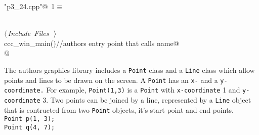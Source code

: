 \documentclass{article}
\begin{document}
\begin{flushleft} \small
\begin{minipage}{\linewidth}\label{scrap1}\raggedright\small
{} \verb@"p3_24.cpp"@\nobreak\ {\footnotesize {1}}$\equiv$
\vspace{-1ex}
\begin{list}{}{} \item
\mbox{}\verb@@\\
\mbox{}\verb@@\hbox{$\langle\,${\it Include Files}\nobreak\ {\footnotesize {}}$\,\rangle$}\verb@@\\
\mbox{}\verb@int ccc_win_main()//authors entry point that calls name@\\
\mbox{}@\\
\mbox{}\verb@@{\NWsep}
\end{list}
\vspace{-1.5ex}
\footnotesize
\begin{list}{}{\setlength{\itemsep}{-\parsep}\setlength{\itemindent}{-\leftmargin}}

\item{}
\end{list}
\end{minipage}\vspace{4ex}
\end{flushleft}
The authors graphics library includes a \verb|Point| class and
a \verb|Line| class which allow points and lines to be drawn on
the screen. A \verb|Point| has an \verb|x-| and a \verb|y-coordinate.|
For example, \verb|Point(1,3)| is a \verb|Point| with \verb|x-coordinate|
1 and \verb|y-coordinate| 3. Two points can be joined by a line, represented
by a \verb|Line| object that is contructed from two \verb|Point| objects,
it's start point and end points.\\
\indent \verb|Point p(1, 3);|\\
\indent \verb|Point q(4, 7);|\\
\end{document}
